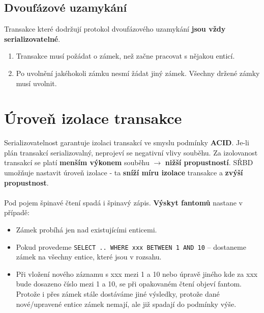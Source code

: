 \subsection{Dvoufázové uzamykání}
Transakce které dodržují protokol dvoufázového uzamykání \textbf{jsou vždy serializovatelné}.
\begin{enumerate}
    \item Transakce musí požádat o zámek, než začne pracovat s nějakou enticí.
    \item Po uvolnění jakéhokoli zámku nesmí žádat jiný zámek. Všechny držené zámky musí uvolnit.
\end{enumerate}


\section{Úroveň izolace transakce}
Serializovatelnost garantuje izolaci transakcí ve smyslu podmínky \textbf{ACID}. Je-li plán transakcí serializovalný, neprojeví se negativní vlivy souběhu. Za izolovanost transakcí se platí \textbf{menším výkonem} souběhu $\rightarrow$ \textbf{nižší propustností}. SŘBD umožňuje nastavit úroveň izolace - ta \textbf{sníží míru izolace} transakce a \textbf{zvýší propustnost}.
\\\\
\noindent Pod pojem špinavé čtení spadá i špinavý zápis. \textbf{Výskyt fantomů} nastane v případě:
\begin{itemize}
    \item Zámek probíhá jen nad existujícími enticemi.
    \item Pokud provedeme \texttt{SELECT .. WHERE xxx BETWEEN 1 AND 10} -- dostaneme zámek na všechny entice, které jsou v rozsahu.
    \item Při vložení nového záznamu s xxx mezi 1 a 10 nebo úpravě jiného kde za xxx bude dosazeno číslo mezi 1 a 10, se při opakovaném čtení objeví fantom. Protože i přes zámek stále dostáváme jiné výsledky, protože dané nové/upravené entice zámek nemají, ale již spadají do podmínky výše.
\end{itemize}
\noindent{}
